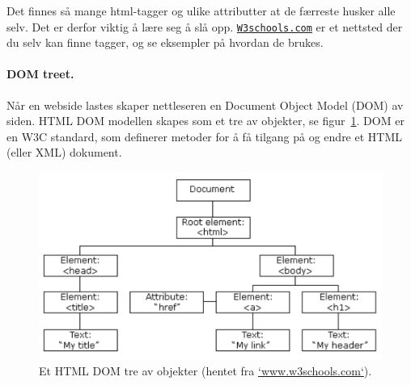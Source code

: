 \documentclass[%
oneside,                 %
final,                   %
10pt]{article}
\newenvironment{notice_mdfboxadmon}[1][]{
\begin{notice_mdfboxmdframed}[frametitle=#1]
}
{
\end{notice_mdfboxmdframed}
}
\begin{document}

 

Det finnes så mange html-tagger og ulike attributter at de færreste
husker alle selv. Det er derfor viktig å lære seg å slå
opp. \href{{http://W3schools.com}}{\nolinkurl{W3schools.com}} er et nettsted der du
selv kan finne tagger, og se eksempler på hvordan de brukes.

\paragraph{DOM treet.}

Når en webside lastes skaper nettleseren en Document Object Model
(DOM) av siden. HTML DOM modellen skapes som et tre av objekter, se
figur~\ref{figure:domtree}. DOM er en W3C standard, som definerer
metoder for å få tilgang på og endre et HTML (eller XML) dokument.


\begin{figure}[t]
  \centerline{\includegraphics[width=0.9\linewidth]{figures/pic_htmltree.pdf}}
  \caption{
  Et HTML DOM tre av objekter (hentet fra \href{{http://www.w3schools.com/js/js_htmldom.asp}}{\protect `www.w3schools.com`}). \label{figure:domtree}
  }
\end{figure}
\end{document}
